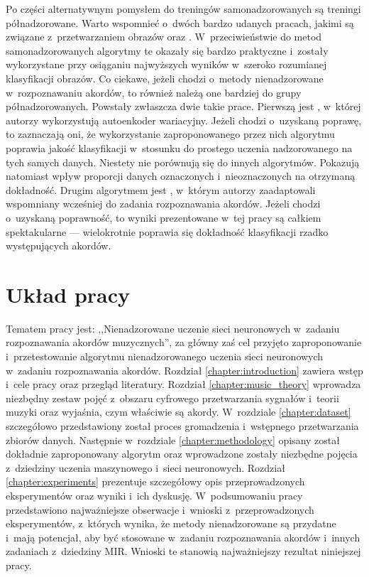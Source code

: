 Po części alternatywnym pomysłem do treningów samonadzorowanych są treningi półnadzorowane. Warto wspomnieć o~dwóch bardzo udanych pracach, jakimi są związane z~przetwarzaniem obrazów \cite{xie_self-training_2020} oraz \cite{pham_meta_2021}. W~przeciwieństwie do metod samonadzorowanych algorytmy te okazały się bardzo praktyczne i~zostały wykorzystane przy osiąganiu najwyższych wyników w~szeroko rozumianej klasyfikacji obrazów. Co ciekawe, jeżeli chodzi o~metody nienadzorowane w~rozpoznawaniu akordów, to również należą one bardziej do grupy półnadzorowanych. Powstały zwłaszcza dwie takie prace. Pierwszą jest \cite{wu_semi-supervised_2020}, w~której autorzy wykorzystują autoenkoder wariacyjny. Jeżeli chodzi o~uzyskaną poprawę, to zaznaczają oni, że wykorzystanie zaproponowanego przez nich algorytmu poprawia jakość klasyfikacji w~stosunku do prostego uczenia nadzorowanego na tych samych danych. Niestety nie porównują się do innych algorytmów. Pokazują natomiast wpływ proporcji danych oznaczonych i~nieoznaczonych na otrzymaną dokładność. Drugim algorytmem jest \cite{bortolozzo_improving_2021}, w~którym autorzy zaadaptowali wspomniany wcześniej \cite{xie_self-training_2020} do zadania rozpoznawania akordów. Jeżeli chodzi o~uzyskaną poprawność, to wyniki prezentowane w~tej pracy są całkiem spektakularne --- wielokrotnie poprawia się dokładność klasyfikacji rzadko występujących akordów.



\section{Układ pracy}

Tematem pracy jest: ,,Nienadzorowane uczenie sieci neuronowych w~zadaniu rozpoznawania akordów muzycznych'', za główny zaś cel przyjęto zaproponowanie i~przetestowanie algorytmu nienadzorowanego uczenia sieci neuronowych w~zadaniu rozpoznawania akordów. Rozdział \ref{chapter:introduction} zawiera wstęp i~cele pracy oraz przegląd literatury. Rozdział \ref{chapter:music_theory} wprowadza niezbędny zestaw pojęć z~obszaru cyfrowego przetwarzania sygnałów i~teorii muzyki oraz wyjaśnia, czym właściwie są akordy. W~rozdziale \ref{chapter:dataset} szczegółowo przedstawiony został proces gromadzenia i~wstępnego przetwarzania zbiorów danych. Następnie w~rozdziale \ref{chapter:methodology} opisany został dokładnie zaproponowany algorytm oraz wprowadzone zostały niezbędne pojęcia z~dziedziny uczenia maszynowego i~sieci neuronowych. Rozdział \ref{chapter:experiments} prezentuje szczegółowy opis przeprowadzonych eksperymentów oraz wyniki i~ich dyskusję. W~podsumowaniu pracy przedstawiono najważniejsze obserwacje i~wnioski z~przeprowadzonych eksperymentów, z~których wynika, że metody nienadzorowane są przydatne i~mają potencjał, aby być stosowane w~zadaniu rozpoznawania akordów i~innych zadaniach z~dziedziny MIR. Wnioski te stanowią najważniejszy rezultat niniejszej pracy.
